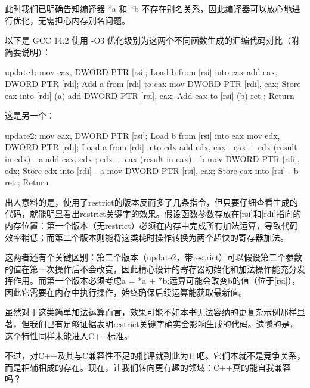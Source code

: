 此时我们已明确告知编译器 *a 和 *b 不存在别名关系，因此编译器可以放心地进行优化，无需担心内存别名问题。

以下是 GCC 14.2 使用 -O3 优化级别为这两个不同函数生成的汇编代码对比（附简要说明）：

\begin{shell}
update1:
  mov eax, DWORD PTR [rsi]; Load b from [rsi] into eax
  add eax, DWORD PTR [rdi]; Add a from [rdi] to eax
  mov DWORD PTR [rdi], eax; Store eax into [rdi] (a)
  add DWORD PTR [rsi], eax; Add eax to [rsi] (b)
  ret ; Return
\end{shell}

这是另一个：

\begin{shell}
update2:
  mov eax, DWORD PTR [rsi]; Load b from [rsi] into eax
  mov edx, DWORD PTR [rdi]; Load a from [rdi] into edx
  add edx, eax ; eax + edx (result in edx) - a
  add eax, edx ; edx + eax (result in eax) - b
  mov DWORD PTR [rdi], edx; Store edx into [rdi] - a
  mov DWORD PTR [rsi], eax; Store eax into [rsi] - b
  ret ; Return
\end{shell}

出人意料的是，使用了restrict的版本反而多了几条指令，但只要仔细查看生成的代码，就能明显看出restrict关键字的效果。假设函数参数存放在[rsi]和[rdi]指向的内存位置：第一个版本（无restrict）必须在内存中完成所有加法运算，导致代码效率稍低；而第二个版本则能将这类耗时操作转换为两个超快的寄存器加法。

这两者还有个关键区别：第二个版本（update2，带restrict）可以假设第二个参数的值在第一次操作后不会改变，因此精心设计的寄存器初始化和加法操作能充分发挥作用。而第一个版本必须考虑a = *a + *b;运算可能会改变b的值（位于[rsi]），因此它需要在内存中执行操作，始终确保后续运算能获取最新值。

虽然对于这类简单加法运算而言，效果可能不如本书无法容纳的更复杂示例那样显著，但我们已有足够证据表明restrict关键字确实会影响生成的代码。遗憾的是，这个特性同样未能进入C++标准。

不过，对C++及其与C兼容性不足的批评就到此为止吧。它们本就不是竞争关系，而是相辅相成的存在。现在，让我们转向更有趣的领域：C++真的能自我兼容吗？












